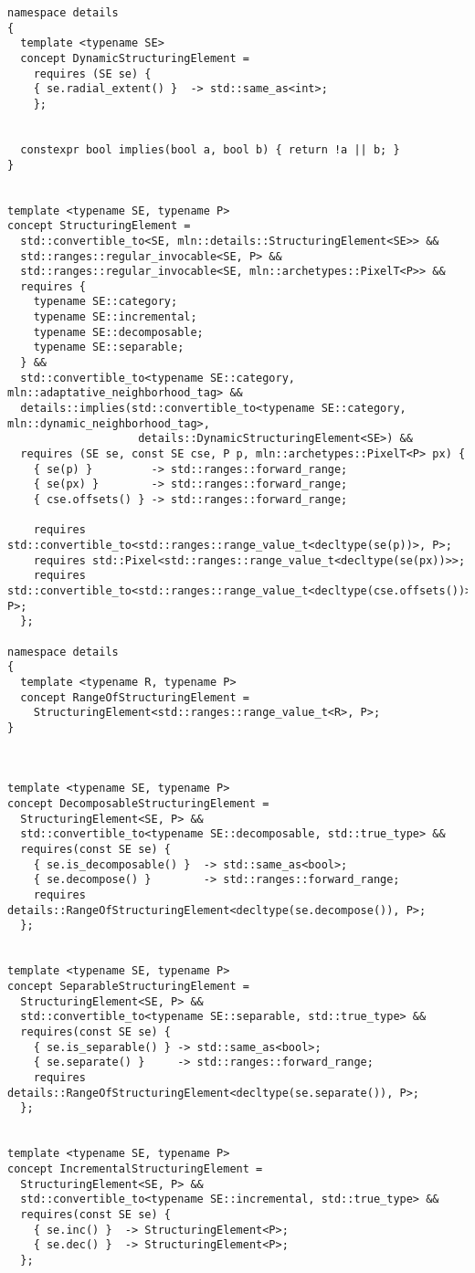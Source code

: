 \begin{verbatim}
namespace details
{
  template <typename SE>
  concept DynamicStructuringElement =
    requires (SE se) {
    { se.radial_extent() }  -> std::same_as<int>;
    };


  constexpr bool implies(bool a, bool b) { return !a || b; }
}


template <typename SE, typename P>
concept StructuringElement =
  std::convertible_to<SE, mln::details::StructuringElement<SE>> &&
  std::ranges::regular_invocable<SE, P> &&
  std::ranges::regular_invocable<SE, mln::archetypes::PixelT<P>> &&
  requires {
    typename SE::category;
    typename SE::incremental;
    typename SE::decomposable;
    typename SE::separable;
  } &&
  std::convertible_to<typename SE::category, mln::adaptative_neighborhood_tag> &&
  details::implies(std::convertible_to<typename SE::category, mln::dynamic_neighborhood_tag>,
                    details::DynamicStructuringElement<SE>) &&
  requires (SE se, const SE cse, P p, mln::archetypes::PixelT<P> px) {
    { se(p) }         -> std::ranges::forward_range;
    { se(px) }        -> std::ranges::forward_range;
    { cse.offsets() } -> std::ranges::forward_range;

    requires std::convertible_to<std::ranges::range_value_t<decltype(se(p))>, P>;
    requires std::Pixel<std::ranges::range_value_t<decltype(se(px))>>;
    requires std::convertible_to<std::ranges::range_value_t<decltype(cse.offsets())>, P>;
  };

namespace details
{
  template <typename R, typename P>
  concept RangeOfStructuringElement =
    StructuringElement<std::ranges::range_value_t<R>, P>;
}



template <typename SE, typename P>
concept DecomposableStructuringElement =
  StructuringElement<SE, P> &&
  std::convertible_to<typename SE::decomposable, std::true_type> &&
  requires(const SE se) {
    { se.is_decomposable() }  -> std::same_as<bool>;
    { se.decompose() }        -> std::ranges::forward_range;
    requires details::RangeOfStructuringElement<decltype(se.decompose()), P>;
  };


template <typename SE, typename P>
concept SeparableStructuringElement =
  StructuringElement<SE, P> &&
  std::convertible_to<typename SE::separable, std::true_type> &&
  requires(const SE se) {
    { se.is_separable() } -> std::same_as<bool>;
    { se.separate() }     -> std::ranges::forward_range;
    requires details::RangeOfStructuringElement<decltype(se.separate()), P>;
  };


template <typename SE, typename P>
concept IncrementalStructuringElement =
  StructuringElement<SE, P> &&
  std::convertible_to<typename SE::incremental, std::true_type> &&
  requires(const SE se) {
    { se.inc() }  -> StructuringElement<P>;
    { se.dec() }  -> StructuringElement<P>;
  };
\end{verbatim}

